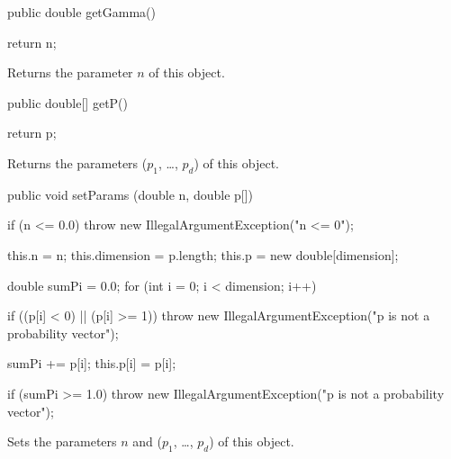 \begin{code}

   public double getGamma()\begin{hide} {
      return n;
   }\end{hide}
\end{code}
\begin{tabb}
   Returns the parameter $n$ of this object.
\end{tabb}
\begin{code}

   public double[] getP()\begin{hide} {
      return p;
   }\end{hide}
\end{code}
\begin{tabb}
   Returns the parameters ($p_1$, \ldots, $p_d$) of this object.
\end{tabb}
\begin{code}

   public void setParams (double n, double p[])\begin{hide} {
      if (n <= 0.0)
         throw new IllegalArgumentException("n <= 0");

      this.n = n;
      this.dimension = p.length;
      this.p = new double[dimension];

      double sumPi = 0.0;
      for (int i = 0; i < dimension; i++) {
         if ((p[i] < 0) || (p[i] >= 1))
            throw new IllegalArgumentException("p is not a probability vector");

         sumPi += p[i];
         this.p[i] = p[i];
      }

      if (sumPi >= 1.0)
         throw new IllegalArgumentException("p is not a probability vector");
   }\end{hide}
\end{code}
\begin{tabb}
   Sets the parameters $n$ and ($p_1$, \ldots, $p_d$) of this object.
\end{tabb}
\begin{code}\begin{hide}
}\end{hide}
\end{code}

